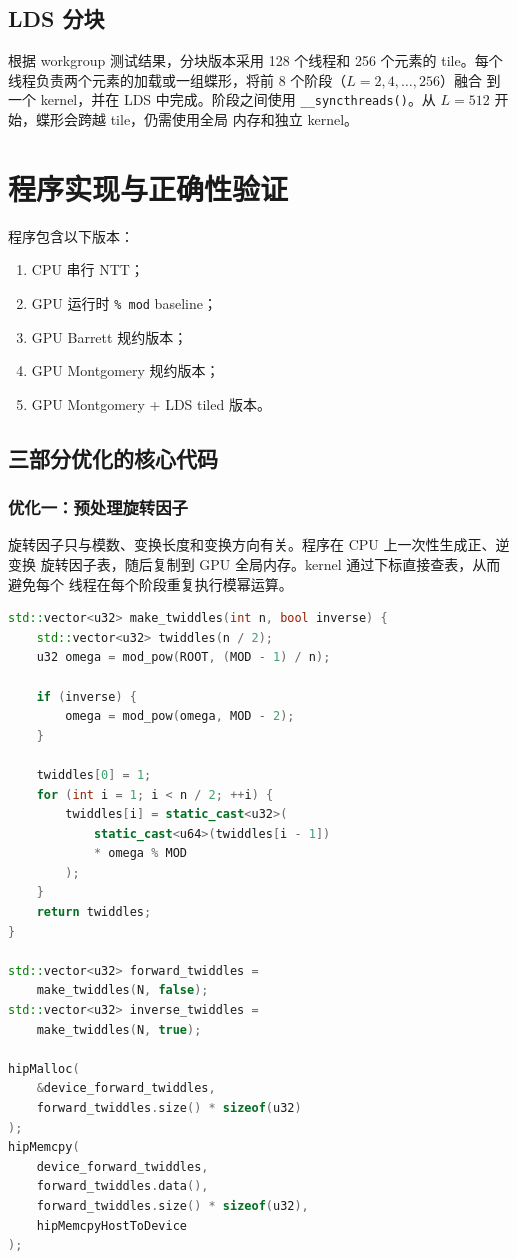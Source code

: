 ﻿\documentclass[a4paper]{article}
\begin{document}
\subsection{LDS 分块}

根据 workgroup 测试结果，分块版本采用 128 个线程和 256 个元素的 tile。每个
线程负责两个元素的加载或一组蝶形，将前 8 个阶段（$L=2,4,\ldots,256$）融合
到一个 kernel，并在 LDS 中完成。阶段之间使用
\texttt{\_\_syncthreads()}。从 $L=512$ 开始，蝶形会跨越 tile，仍需使用全局
内存和独立 kernel。

\section{程序实现与正确性验证}

程序包含以下版本：

\begin{enumerate}
  \item CPU 串行 NTT；
  \item GPU 运行时 \texttt{\% mod} baseline；
  \item GPU Barrett 规约版本；
  \item GPU Montgomery 规约版本；
  \item GPU Montgomery + LDS tiled 版本。
\end{enumerate}

\subsection{三部分优化的核心代码}

\subsubsection{优化一：预处理旋转因子}

旋转因子只与模数、变换长度和变换方向有关。程序在 CPU 上一次性生成正、逆变换
旋转因子表，随后复制到 GPU 全局内存。kernel 通过下标直接查表，从而避免每个
线程在每个阶段重复执行模幂运算。

\begin{lstlisting}[language=C++,caption={旋转因子预计算与传输}]
std::vector<u32> make_twiddles(int n, bool inverse) {
    std::vector<u32> twiddles(n / 2);
    u32 omega = mod_pow(ROOT, (MOD - 1) / n);

    if (inverse) {
        omega = mod_pow(omega, MOD - 2);
    }

    twiddles[0] = 1;
    for (int i = 1; i < n / 2; ++i) {
        twiddles[i] = static_cast<u32>(
            static_cast<u64>(twiddles[i - 1])
            * omega % MOD
        );
    }
    return twiddles;
}

std::vector<u32> forward_twiddles =
    make_twiddles(N, false);
std::vector<u32> inverse_twiddles =
    make_twiddles(N, true);

hipMalloc(
    &device_forward_twiddles,
    forward_twiddles.size() * sizeof(u32)
);
hipMemcpy(
    device_forward_twiddles,
    forward_twiddles.data(),
    forward_twiddles.size() * sizeof(u32),
    hipMemcpyHostToDevice
);
\end{lstlisting}
\end{document}
